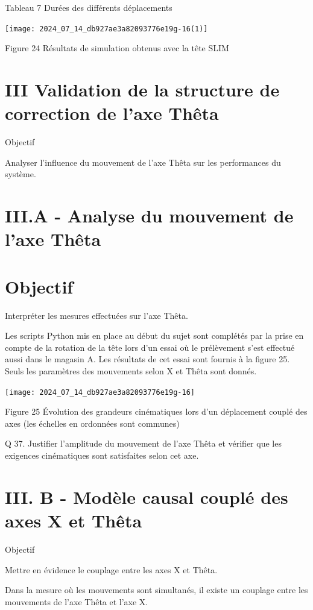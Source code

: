 \documentclass[10pt]{article}
\begin{document}
Tableau 7 Durées des différents déplacements

\begin{center}
\texttt{[image: 2024\_07\_14\_db927ae3a82093776e19g-16(1)]}
\end{center}

Figure 24 Résultats de simulation obtenus avec la tête SLIM

\section*{III Validation de la structure de correction de l'axe Thêta}
Objectif

Analyser l'influence du mouvement de l'axe Thêta sur les performances du système.

\section*{III.A - Analyse du mouvement de l'axe Thêta}
\section*{Objectif}
Interpréter les mesures effectuées sur l'axe Thêta.

Les scripts Python mis en place au début du sujet sont complétés par la prise en compte de la rotation de la tête lors d'un essai où le prélèvement s'est effectué aussi dans le magasin A. Les résultats de cet essai sont fournis à la figure 25. Seuls les paramètres des mouvements selon X et Thêta sont donnés.

\begin{center}
\texttt{[image: 2024\_07\_14\_db927ae3a82093776e19g-16]}
\end{center}

Figure 25 Évolution des grandeurs cinématiques lors d'un déplacement couplé des axes (les échelles en ordonnées sont communes)

Q 37. Justifier l'amplitude du mouvement de l'axe Thêta et vérifier que les exigences cinématiques sont satisfaites selon cet axe.

\section*{III. B - Modèle causal couplé des axes X et Thêta}
Objectif

Mettre en évidence le couplage entre les axes X et Thêta.

Dans la mesure où les mouvements sont simultanés, il existe un couplage entre les mouvements de l'axe Thêta et l'axe X.
\end{document}
